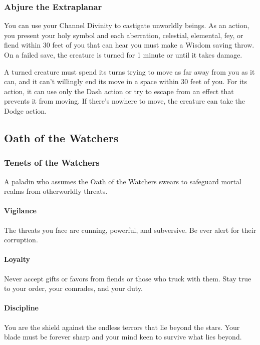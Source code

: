 \documentclass[letterpaper,openany,oneside,twocolumn]{book}
\begin{document}
\subsubsection*{Abjure the Extraplanar}
You can use your Channel Divinity to castigate unworldly beings. As an action, you present your holy symbol and each aberration, celestial, elemental, fey, or fiend within 30 feet of you that can hear you must make a Wisdom saving throw. On a failed save, the creature is turned for 1 minute or until it takes damage.

A turned creature must spend its turns trying to move as far away from you as it can, and it can't willingly end its move in a space within 30 feet of you. For its action, it can use only the Dash action or try to escape from an effect that prevents it from moving. If there's nowhere to move, the creature can take the Dodge action.
\subsection*{Oath of the Watchers}
\subsubsection*{Tenets of the Watchers}
A paladin who assumes the Oath of the Watchers swears to safeguard mortal realms from otherworldly threats.
\paragraph*{Vigilance} The threats you face are cunning, powerful, and subversive. Be ever alert for their corruption.
\paragraph*{Loyalty} Never accept gifts or favors from fiends or those who truck with them. Stay true to your order, your comrades, and your duty.
\paragraph*{Discipline} You are the shield against the endless terrors that lie beyond the stars. Your blade must be forever sharp and your mind keen to survive what lies beyond.
\end{document}

